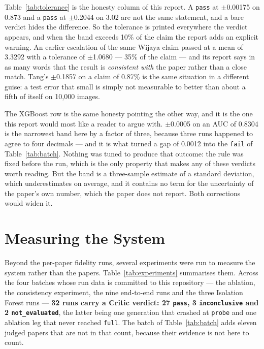 \documentclass[11pt]{article}
\begin{document}
Table~\ref{tab:tolerance} is the honesty column of this report. A \texttt{pass} at $\pm$0.00175 on
0.873 and a \texttt{pass} at $\pm$0.2044 on 3.02 are not the same statement, and a bare verdict
hides the difference. So the tolerance is printed everywhere the verdict appears, and when the
band exceeds 10\% of the claim the report adds an explicit warning. An earlier escalation of the
same Wijaya claim passed at a mean of 3.3292 with a tolerance of $\pm$1.0680 --- 35\% of the claim
--- and its report says in as many words that the result is \emph{consistent with} the paper rather
than a close match. Tang's $\pm$0.1857 on a claim of 0.87\% is the same situation in a different
guise: a test error that small is simply not measurable to better than about a fifth of itself on
10{,}000 images.

The XGBoost row is the same honesty pointing the other way, and it is the one this report would
most like a reader to argue with. $\pm$0.0005 on an AUC of 0.8304 is the narrowest band here by a
factor of three, because three runs happened to agree to four decimals --- and it is what turned a
gap of 0.0012 into the \texttt{fail} of Table~\ref{tab:batch}. Nothing was tuned to produce that
outcome: the rule was fixed before the run, which is the only property that makes any of these
verdicts worth reading. But the band is a three-sample estimate of a standard deviation, which
underestimates on average, and it contains no term for the uncertainty of the paper's own
number, which the paper does not report. Both corrections would widen it.

\section{Measuring the System}
\label{sec:experiments}

Beyond the per-paper fidelity runs, several experiments were run to measure the system rather than
the papers. Table~\ref{tab:experiments} summarises them. Across the four batches whose run data is
committed to this repository --- the ablation, the consistency experiment, the nine end-to-end runs
and the three Isolation Forest runs --- \textbf{32 runs carry a Critic verdict: 27
\texttt{pass}, 3 \texttt{inconclusive} and 2 \texttt{not\_evaluated}}, the latter being one
generation that crashed at \texttt{probe} and one ablation leg that never reached \texttt{full}.
The batch of Table~\ref{tab:batch} adds eleven judged papers that are not in that count, because
their evidence is not here to count.
\end{document}

